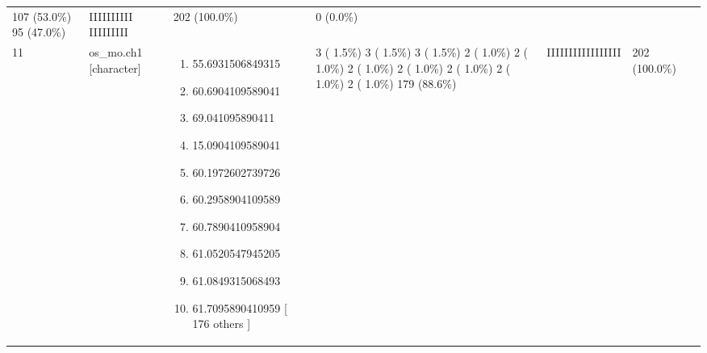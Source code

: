\documentclass[
]{article}
\providecommand{\tightlist}{%
  \setlength{\itemsep}{0pt}\setlength{\parskip}{0pt}}
\begin{document}
\begin{longtable}[]{@{}lllllll@{}}
\begin{minipage}[t]{0.14\columnwidth}
107 (53.0\%)
95 (47.0\%)\strut
\end{minipage} & \begin{minipage}[t]{0.14\columnwidth}\raggedright
IIIIIIIIII
IIIIIIIII\strut
\end{minipage} & \begin{minipage}[t]{0.07\columnwidth}\raggedright
202
(100.0\%)\strut
\end{minipage} & \begin{minipage}[t]{0.07\columnwidth}\raggedright
0
(0.0\%)\strut
\end{minipage}\tabularnewline
\begin{minipage}[t]{0.03\columnwidth}\raggedright
11\strut
\end{minipage} & \begin{minipage}[t]{0.16\columnwidth}\raggedright
os\_mo.ch1
{[}character{]}\strut
\end{minipage} & \begin{minipage}[t]{0.20\columnwidth}\raggedright
\begin{enumerate}
\def\labelenumi{\arabic{enumi}.}
\tightlist
\item
  55.6931506849315
\item
  60.6904109589041
\item
  69.041095890411
\item
  15.0904109589041
\item
  60.1972602739726
\item
  60.2958904109589
\item
  60.7890410958904
\item
  61.0520547945205
\item
  61.0849315068493
\item
  61.7095890410959
  {[} 176 others {]}
\end{enumerate}\strut
\end{minipage} & \begin{minipage}[t]{0.14\columnwidth}\raggedright
3 ( 1.5\%)
3 ( 1.5\%)
3 ( 1.5\%)
2 ( 1.0\%)
2 ( 1.0\%)
2 ( 1.0\%)
2 ( 1.0\%)
2 ( 1.0\%)
2 ( 1.0\%)
2 ( 1.0\%)
179 (88.6\%)\strut
\end{minipage} & \begin{minipage}[t]{0.14\columnwidth}\raggedright
IIIIIIIIIIIIIIIII\strut
\end{minipage} & \begin{minipage}[t]{0.07\columnwidth}\raggedright
202
(100.0\%)\strut
\end{minipage} & \begin{minipage}[t]{0.07\columnwidth}\raggedright

\end{minipage}
\end{longtable}
\end{document}
